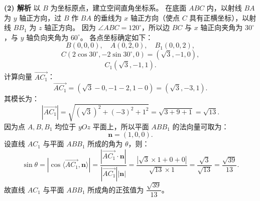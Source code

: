 \begin{answer}
\textbf{(2) 解析} 以 $B$ 为坐标原点，建立空间直角坐标系。
在底面 $ABC$ 内，以射线 $BA$ 为 $y$ 轴正方向，过 $B$ 作 $BA$ 的垂线为 $x$ 轴正方向（使点 $C$ 具有正横坐标），以射线 $BB_1$ 为 $z$ 轴正方向。
因为 $\angle ABC = 120^\circ$，所以边 $BC$ 与 $x$ 轴正向夹角为 $30^\circ$，与 $y$ 轴负向夹角为 $60^\circ$。
各点坐标确定如下：
\nopagebreak[4]
\[B(0, 0, 0),\quad A(0, 2, 0),\quad B_1(0, 0, 2),\]
\nopagebreak[4]
\[C(2\cos 30^\circ, -2\sin 30^\circ, 0) = (\sqrt3, -1, 0),\]
\nopagebreak[4]
\[C_1(\sqrt3, -1, 1).\]
计算向量 $\overrightarrow{AC_1}$：
\nopagebreak[4]
\[\overrightarrow{AC_1} = (\sqrt3 - 0, -1 - 2, 1 - 0) = (\sqrt3, -3, 1).\]
其模长为：
\nopagebreak[4]
\[|\overrightarrow{AC_1}| = \sqrt{(\sqrt3)^2 + (-3)^2 + 1^2} = \sqrt{3 + 9 + 1} = \sqrt{13}.\]
因为点 $A, B, B_1$ 均位于 $yOz$ 平面上，所以平面 $ABB_1$ 的法向量可取为：
\nopagebreak[4]
\[\boldsymbol n = (1, 0, 0).\]
设直线 $AC_1$ 与平面 $ABB_1$ 所成的角为 $\theta$，则：
\nopagebreak[4]
\[\sin\theta = |\cos\langle \overrightarrow{AC_1}, \boldsymbol n\rangle| = \dfrac{|\overrightarrow{AC_1} \cdot \boldsymbol n|}{|\overrightarrow{AC_1}| |\boldsymbol n|} = \dfrac{|\sqrt3 \times 1 + 0 + 0|}{\sqrt{13} \times 1} = \dfrac{\sqrt3}{\sqrt{13}} = \dfrac{\sqrt{39}}{13}.\]
故直线 $AC_1$ 与平面 $ABB_1$ 所成角的正弦值为 $\dfrac{\sqrt{39}}{13}$。



\end{answer}
